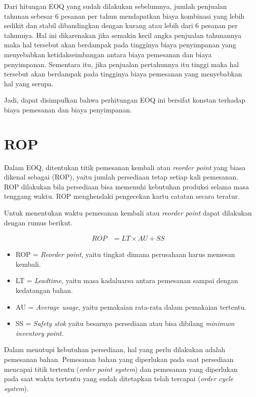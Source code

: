 Dari hitungan EOQ yang sudah dilakukan sebelumnya, jumlah penjualan tahunan sebesar 6 pesanan per tahun mendapatkan biaya kombinasi yang lebih sedikit dan stabil dibandingkan dengan kurang atau lebih dari 6 pesanan per tahunnya. Hal ini dikarenakan jika semakin kecil angka penjualan tahunannya maka hal tersebut akan berdampak pada tingginya biaya penyimpanan yang menyebabkan ketidakseimbangan antara biaya pemesanan dan biaya penyimpanan. Sementara itu, jika penjualan pertahunnya itu tinggi maka hal tersebut akan berdampak pada tingginya biaya pemesanan yang menyebabkan hal yang serupa.

Jadi, dapat disimpulkan bahwa perhitungan EOQ ini bersifat konstan terhadap biaya pemesanan dan biaya penyimpanan.

\section{ROP}

Dalam EOQ, ditentukan titik pemesanan kembali atau \textit{reorder point} yang biasa dikenal sebagai (ROP), yaitu jumlah persediaan tetap setiap kali pemesanan. ROP dilakukan bila persediaan bisa memenuhi kebutuhan produksi selama masa tenggang waktu. ROP menghendaki pengecekan kartu catatan secara teratur.

Untuk menentukan waktu pemesanan kembali atau \textit{reorder point} dapat dilakukan dengan rumus berikut.

\begin{equation}
    \begin{split}
		ROP
		&= LT \times AU + SS
    \end{split}
\end{equation}

\begin{itemize}
	\item ROP = \textit{Reorder point}, yaitu tingkat dimana perusahaan harus memesan kembali. 
	\item LT = \textit{Leadtime}, yaitu masa kadaluarsa antara pemesanan sampai dengan kedatangan bahan.
	\item AU = \textit{Average usage}, yaitu pemakaian rata-rata dalam pemakaian tertentu.
	\item SS = \textit{Safety stok} yaitu besarnya persediaan atau bisa dibilang \textit{minimum inventory point}.
\end{itemize}

Dalam menutupi kebutuhan persediaan, hal yang perlu dilakukan adalah pemesanan bahan. Pemesanan bahan yang diperlukan pada saat persediaan mencapai titik tertentu (\textit{order point system}) dan pemesanan yang diperlukan pada saat waktu tertentu yang sudah ditetapkan telah tercapai (\textit{order cycle system}).

